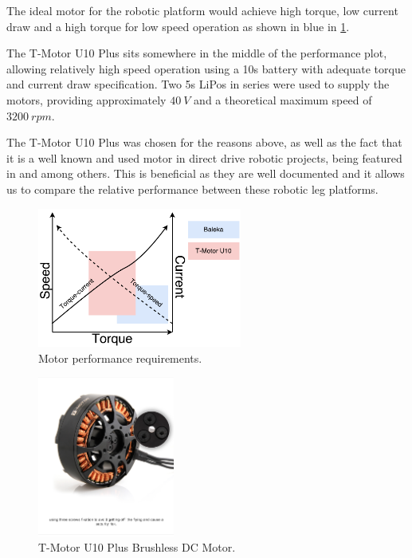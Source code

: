 The ideal motor for the robotic platform would achieve high torque, low current draw and a high torque for low speed operation as shown in blue in \cref{fig:Motor performance requirements}. 

The T-Motor U10 Plus sits somewhere in the middle of the performance plot, allowing relatively high speed operation using a 10s battery with adequate torque and current draw specification. Two 5s LiPos in series were used to supply the motors, providing approximately $40\ V$ and a theoretical maximum speed of $3200\ rpm$.

The T-Motor U10 Plus was chosen for the reasons above, as well as the fact that it is a well known and used motor in direct drive robotic projects, being featured in \cite{Duperret} and \cite{Kalouche2016} among others. This is beneficial as they are well documented and it allows us to compare the relative performance between these robotic leg platforms.

\begin{figure}
\centering
\includegraphics[width=0.6\textwidth]{images/motor/bldc-torque-speed-relation.pdf} 
\caption{Motor performance requirements.}
\label{fig:Motor performance requirements}
\end{figure}

\begin{figure}
\centering
\includegraphics[clip, trim=0cm 5cm 0cm 2cm, width=0.4\textwidth]{images/motor/TMotorU10Plus} 
\caption{T-Motor U10 Plus Brushless DC Motor.}
\label{fig:TMotorU10Plus}
\end{figure}

